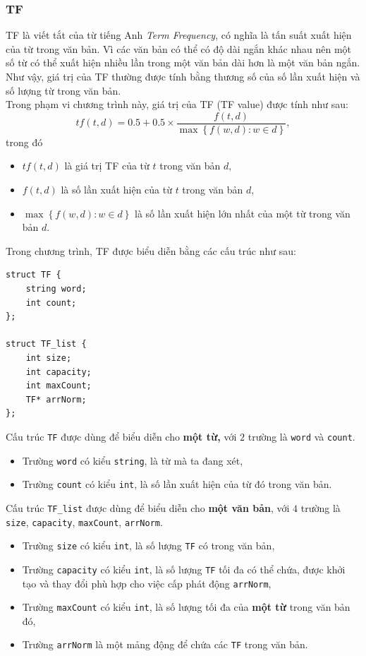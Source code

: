 \documentclass[12pt,a4paper]{article}
\begin{document}
\subsubsection{TF}
TF là viết tắt của từ tiếng Anh \textit{Term Frequency}, có nghĩa là tấn suất xuất hiện của từ trong văn bản. Vì các văn bản có thể có độ dài ngắn khác nhau nên một số từ có thể xuất hiện nhiều lần trong một văn bản dài hơn là một văn bản ngắn. Như vậy, giá trị của TF thường được tính bằng thương số của số lần xuất hiện và số lượng từ trong văn bản. \cite{1} \\
Trong phạm vi chương trình này, giá trị của TF (TF value) được tính như sau:
\begin{equation}
tf\left( {t,d} \right) = 0.5 + 0.5 \times \frac{{f\left( {t,d} \right)}}{{\max \left\{ {f\left( {w,d} \right):w \in d} \right\}}},
\label{tffor}
\end{equation}
trong đó
\begin{itemize}
\item \(tf\left( {t,d} \right)\) là giá trị TF của từ \(t\) trong văn bản \(d,\)
\item \({f\left( {t,d} \right)}\) là số lần xuất hiện của từ \(t\) trong văn bản \(d,\)
\item \({\max \left\{ {f\left( {w,d} \right):w \in d} \right\}}\) là số lần xuất hiện lớn nhất của một từ trong văn bản \(d.\)
\end{itemize}
Trong chương trình, TF được biểu diễn bằng các cấu trúc như sau:
\begin{lstlisting}
struct TF {
    string word;
    int count;
};

struct TF_list {
	int size;
	int capacity;
	int maxCount;
	TF* arrNorm;
};
\end{lstlisting}
Cấu trúc \lstinline{TF} được dùng để biểu diễn cho \textbf{một từ,} với \(2\) trường là \lstinline{word} và \lstinline{count}.
\begin{itemize}
\item Trường \lstinline{word} có kiểu \lstinline{string}, là từ mà ta đang xét,
\item Trường \lstinline{count} có kiểu \lstinline{int}, là số lần xuất hiện của từ đó trong văn bản.
\end{itemize}
Cấu trúc \lstinline{TF_list} được dùng để biểu diễn cho \textbf{một văn bản}, với \(4\) trường là \lstinline{size}, \lstinline{capacity}, \lstinline{maxCount}, \lstinline{arrNorm}.
\begin{itemize}
\item Trường \lstinline{size} có kiểu \lstinline{int}, là số lượng \lstinline{TF} có trong văn bản,
\item Trường \lstinline{capacity} có kiểu \lstinline{int}, là số lượng \lstinline{TF} tối đa có thể chứa, được khởi tạo và thay đổi phù hợp cho việc cấp phát động \lstinline{arrNorm},
\item Trường \lstinline{maxCount} có kiểu \lstinline{int}, là số lượng tối đa của \textbf{một từ} trong văn bản đó,
\item Trường \lstinline{arrNorm} là một mảng động để chứa các \lstinline{TF} trong văn bản.
\end{itemize}
\end{document}
